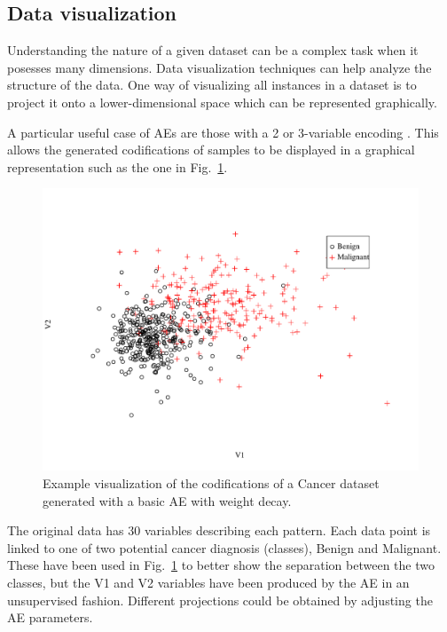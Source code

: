 \documentclass[preprint,5p,compress]{elsarticle}
\begin{document}
\subsection{Data visualization}\label{Sec.Visualization}

Understanding the nature of a given dataset can be a complex task when it posesses many dimensions. Data visualization techniques \cite{InfoVis} can help analyze the structure of the data. One way of visualizing all instances in a dataset is to project it onto a lower-dimensional space which can be represented graphically.

A particular useful case of AEs are those with a 2 or 3-variable encoding \cite{hinton_reducing_2006}. This allows the generated codifications of samples to be displayed in a graphical representation such as the one in Fig.~\ref{Fig.Cancer}.

\begin{figure}[h!]
  \centering
  \includegraphics[width=.95\columnwidth]{cancer_2var.pdf}
  \caption{\label{Fig.Cancer}Example visualization of the codifications of a Cancer dataset generated with a basic AE with weight decay.}
\end{figure}

The original data \cite{WDBC} has 30 variables describing each pattern. Each data point is linked to one of two potential cancer diagnosis (classes), Benign and Malignant. These have been used in Fig.~\ref{Fig.Cancer} to better show the separation between the two classes, but the V1 and V2 variables have been produced by the AE in an unsupervised fashion. Different projections could be obtained by adjusting the AE parameters.
\end{document}
